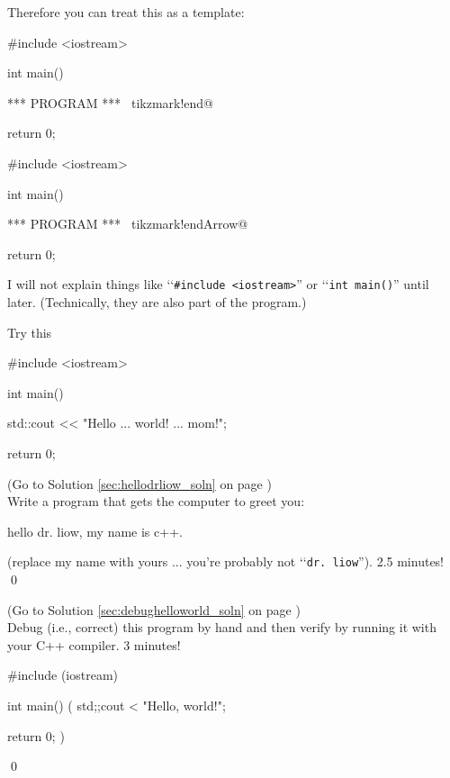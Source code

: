 Therefore you can treat this as a template:


\begin{console}[commandchars=\~\!\@]
#include <iostream>

int main()
{

    *** PROGRAM *** ~tikzmark!end@

    return 0;
}
\end{console}
\begin{console}[commandchars=\~\!\@]
#include <iostream>

int main()
{

    *** PROGRAM *** ~tikzmark!endArrow@
    
    return 0;
}
\end{console}

I will not explain things like 
\lq\lq \verb!#include <iostream>!'' or 
\lq\lq\verb!int main()!'' until later. 
(Technically, they are also part of  the program.)



Try this
\begin{console}
#include <iostream>

int main()
{
    std::cout << "Hello ... world! ... mom!\n";

    return 0;
}
\end{console}



\begin{ex} 
\label{sec:hellodrliow}
(Go to Solution \ref{sec:hellodrliow_soln} 
on page \pageref{sec:hellodrliow_soln}) 
\\
Write a program that gets the computer to greet you:
\begin{console}
hello dr. liow, my name is c++.
\end{console}
(replace my name with yours ...  you're probably not 
\lq\lq\verb!dr. liow!'').
2.5 minutes!
\qed
\end{ex}


\begin{ex}
\label{sec:debughelloworld}
(Go to Solution \ref{sec:debughelloworld_soln} 
on page \pageref{sec:debughelloworld_soln}) 
\\
Debug (i.e., correct) this program by hand 
and then verify by running it 
with your C++ compiler.
3 minutes!
\begin{console}
#include (iostream)

int main()
(
    std;;cout < "Hello, world!\n";

    return 0;
)
\end{console}
\qed
\end{ex}



